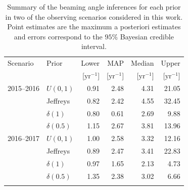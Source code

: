 \documentclass[twocolumn,nofootinbib]{revtex4-1}
\newcommand{\yr}{\mathrm{yr}}
\begin{document}
\begin{table}
\centering
\begin{tabular}{llrrrr}
  \toprule
  Scenario & Prior & Lower & MAP & Median & Upper \\
  && [$\yr^{-1}$] & [$\yr^{-1}$]    & [$\yr^{-1}$]    & [$\yr^{-1}$]  \\
  \colrule
2015--2016 & $U(0,1)$ & 0.91 & 2.48 & 4.31 & 21.05\\
           & Jeffreys & 0.82 & 2.42 & 4.55 & 32.45\\
        & $\delta(1)$ & 0.80 & 0.61 & 2.69 & 9.88\\
      & $\delta(0.5)$ & 1.15 & 2.67 & 3.81 & 13.96\\
  \colrule
    2016--2017 & $U(0,1)$ & 1.00 & 2.58 & 3.32 & 12.16\\
               & Jeffreys & 0.89 & 2.47 & 3.41 & 22.83\\
             &$\delta(1)$ & 0.97 & 1.65 & 2.13 & 4.73\\
           &$\delta(0.5)$ & 1.35 & 2.38 & 3.02 & 6.66\\
\botrule
\end{tabular}
\caption{Summary of the beaming angle inferences for each prior in two of the observing scenarios considered in this work.
    Point estimates are the maximum a posteriori estimates and errors correspond to the $95\%$ Bayesian credible interval.
    \label{tab:aligo_beam_inference}}
\end{table}
\end{document}

